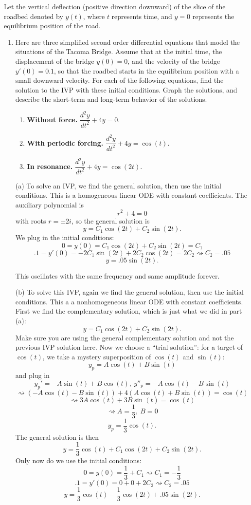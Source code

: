 \documentclass[12pt]{amsart}
\numberwithin{equation}{section}
\theoremstyle{plain} %
\newcommand{\rsa}{\rightsquigarrow}
\theoremstyle{definition}
\theoremstyle{remark}
\begin{document}
Let the vertical deflection
(positive direction downward) of the slice of the roadbed denoted by $y(t)$, where $t$ represents time, and $y=0$ represents the equilibrium position of the road. 

\begin{enumerate}
\item
Here are three simplified second order differential equations that model the situations of the Tacoma Bridge. Assume that at the initial time, the displacement of the bridge $y(0)=0$, and the velocity of the bridge $y'(0)=0.1$,  so that the roadbed
starts in the equilibrium position with a small downward velocity. For each of the following equations, find the solution to the IVP with these initial conditions. Graph the solutions, and describe the short-term and long-term behavior of the solutions.
\begin{enumerate}
\item {\bf Without force.} $\dfrac{d^2y}{dt^2} + 4y = 0$.
\item {\bf With periodic forcing.} $\dfrac{d^2y}{dt^2} + 4y = \cos(t)$.
\item {\bf In resonance.} $\dfrac{d^2y}{dt^2} + 4y = \cos(2t)$.
\end{enumerate}
\begin{framed}
(a) To solve an IVP, we find the general solution, then use the initial conditions.
This is a homogeneous linear ODE with constant coefficients. The auxiliary polynomial is
\[ r^2 + 4 = 0\]
with roots $r=\pm 2i$, so the general solution is
\[ y = C_1 \cos(2t) + C_2 \sin(2t).\]
We plug in the initial conditions:
\[ 0 = y(0) = C_1 \cos(2t) + C_2 \sin(2t) = C_1\]
\[ .1 = y'(0) = -2 C_1 \sin(2t) + 2 C_2 \cos(2t) = 2 C_2 \rsa C_2 = .05\]
\[ y = .05 \sin(2t).\]

This oscillates with the same frequency and same amplitude forever.

(b) To solve this IVP, again we find the general solution, then use the initial conditions. This a a nonhomogeneous linear ODE with constant coefficients. First we find the complementary solution, which is just what we did in part (a):
\[ y = C_1 \cos(2t) + C_2 \sin(2t).\]
Make sure you are using the general complementary solution and not the previous IVP solution here. Now we choose a ``trial solution'': for a target of $\cos(t)$, we take a mystery superposition of $\cos(t)$ and $\sin(t)$:
\[ y_p = A \cos(t) +  B \sin(t)\]
and plug in
\[ y_p' = -A \sin(t) + B\cos(t), \ y''_p = -A \cos(t) - B \sin(t)\]
\[ \rsa (-A \cos(t) - B \sin(t)) + 4 ( A \cos(t) +  B \sin(t)) = \cos(t)\]
\[ \rsa 3A \cos(t) + 3B\sin(t) = \cos(t)\]
\[\rsa A= \frac{1}{3}, \ B= 0\]
\[ y_p  = \frac{1}{3} \cos(t).\]
The general solution is then
\[ y = \frac{1}{3} \cos(t) + C_1 \cos(2t) + C_2 \sin(2t).\]
Only now do we use the initial conditions:
\[ 0 = y(0) = \frac{1}{3} + C_1 \rsa C_1 = - \frac{1}{3}\]
\[ .1 = y'(0) = 0 + 0 + 2 C_2 \rsa C_2 = .05\]
\[ y = \frac{1}{3} \cos(t)  - \frac{1}{3} \cos(2t) + .05 \sin(2t).\]


\end{framed}
\end{enumerate}
\end{document}
